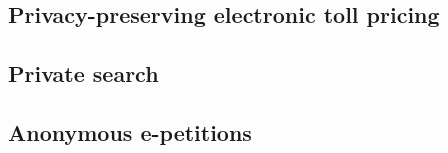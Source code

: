 \documentclass[../overview.tex]{subfiles}
\begin{document}
\subsection{Privacy-preserving electronic toll pricing}

\subsection{Private search}

\subsection{Anonymous e-petitions}
\end{document}
